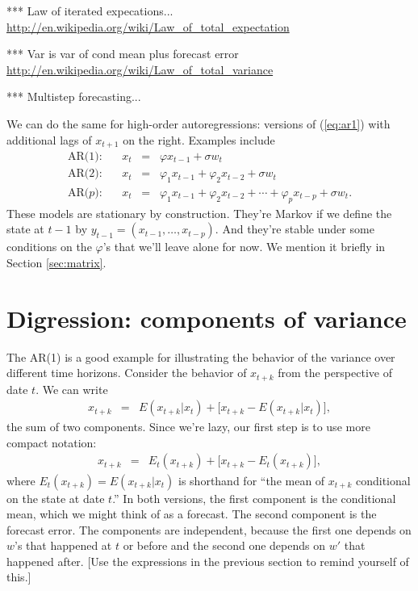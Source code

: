 \documentclass[11pt]{article}
\begin{document}
 
*** Law of iterated expecations... \\
\url{http://en.wikipedia.org/wiki/Law_of_total_expectation}

*** Var is var of cond mean plus forecast error \\
\url{http://en.wikipedia.org/wiki/Law_of_total_variance} 

*** Multistep forecasting...

We can do the same for high-order autoregressions:
versions of (\ref{eq:ar1}) with additional lags of $x_{t+1}$ on the right.
Examples include
\begin{eqnarray*}
    \mbox{AR(1)}:     &&  x_t \;\;=\;\; \varphi x_{t-1} + \sigma w_t  \\
    \mbox{AR($2$)}:   &&  x_t \;\;=\;\; \varphi_1 x_{t-1} + \varphi_2 x_{t-2}
                    +\sigma w_t  \\
    \mbox{AR($p$)}:   &&  x_t \;\;=\;\; \varphi_1 x_{t-1} + \varphi_2 x_{t-2}
                    + \cdots + \varphi_p x_{t-p} + \sigma w_t   .
\end{eqnarray*}
These models are stationary by construction.
They're Markov if we define the state at $t-1$ by
$ y_{t-1} = (x_{t-1}, \ldots, x_{t-p})$.
And they're stable under some conditions on the $\varphi$'s that we'll leave alone
for now.
We mention it briefly in Section \ref{sec:matrix}.


\section{Digression: components of variance}

The AR(1) is a good example for illustrating the behavior of the variance
over different time horizons.
Consider the behavior of $x_{t+k}$ from the perspective of date $t$.
We can write
\begin{eqnarray*}
    x_{t+k} &=& E (x_{t+k} | x_t ) + \big[ x_{t+k} - E (x_{t+k} | x_t )\big] ,
\end{eqnarray*}
the sum of two components.
Since we're lazy, our first step is to use more compact notation:
\begin{eqnarray*}
    x_{t+k} &=& E_t (x_{t+k}) + \big[ x_{t+k} - E_t (x_{t+k})\big] ,
\end{eqnarray*}
where $ E_t (x_{t+k}) = E (x_{t+k} | x_t )$ is shorthand for
``the mean of $x_{t+k}$ conditional on the state at date $t$.''
In both versions, the first component is the conditional mean,
which we might think of as a forecast.
The second component is the forecast error.
The components are independent,
because the first one depends on $w$'s that happened at $t$ or before
and the second one depends on $w'$ that happened after.
[Use the expressions in the previous section to remind yourself of this.]
\end{document}
